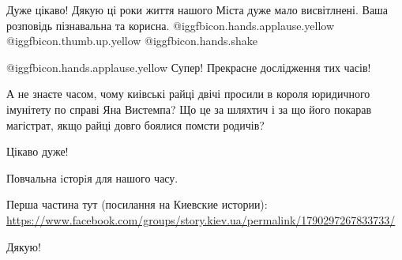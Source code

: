  
 
 
 
 
\zzSecCmt

\begin{itemize} %

Дуже цікаво! Дякую ці роки життя нашого Міста дуже мало висвітлнені. Ваша
розповідь пізнавальна та корисна. @igg{fbicon.hands.applause.yellow}
@igg{fbicon.thumb.up.yellow}  @igg{fbicon.hands.shake} 


 @igg{fbicon.hands.applause.yellow} Супер! Прекрасне дослідження тих часів!

А не знаєте часом, чому киівські райці двічі просили в короля юридичного
імунітету по справі Яна Вистемпа? Що це за шляхтич і за що його покарав
магістрат, якщо райці довго боялися помсти родичів?

Цікаво дуже!

Повчальна iсторiя для нашого часу.


Перша частина тут (посилання на Киевские истории):
\url{https://www.facebook.com/groups/story.kiev.ua/permalink/1790297267833733/}

Дякую!
\end{itemize} %
